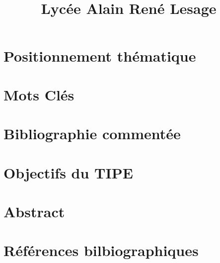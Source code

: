 \documentclass{report}
\title{
		{}\\
		{\large Lycée Alain René Lesage}\\
}
\begin{document}
\maketitle

\chapter{Positionnement thématique}

\chapter{Mots Clés}

\chapter{Bibliographie commentée}

\chapter{Objectifs du TIPE}

\chapter{Abstract}

\chapter{Références bilbiographiques}
\end{document}
